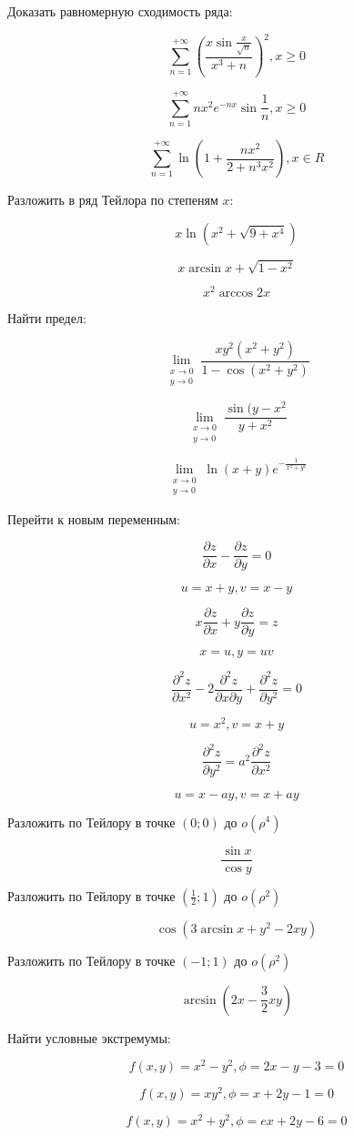 \documentclass[russian]{article}
\newcommand{\dir}[2]{\frac{\partial #1}{\partial #2}}
\newcommand{\dira}[3]{\frac{\partial^2 #1}{\partial #2 \partial #3}}
\newcommand{\dirb}[2]{\frac{\partial^2 #1}{\partial #2^2}}
\begin{document}
Доказать равномерную сходимость ряда:

$$\sum_{n = 1}^{+\infty} \left(\frac{x \sin \frac{x}{\sqrt{n}}}{x^ 3 + n} \right)^2, x \ge 0$$

$$\sum_{n = 1}^{+\infty} n x^2 e^{-nx} \sin \frac{1}{n}, x \ge 0$$

$$\sum_{n = 1}^{+\infty} \ln\left( 1 + \frac{nx^2}{2 + n^3x^2}\right), x \in R$$

Разложить в ряд Тейлора по степеням $x$:

$$x \ln (x^2 + \sqrt{9 + x^4})$$

$$x \arcsin x + \sqrt{1 - x^2}$$

$$x^2 \arccos 2x$$

Найти предел:

$$\lim_{\substack{x \to 0 \\ y \to 0}}  \frac{xy^2(x^2 + y^2)}{1 - \cos (x^2 + y^2)}$$

$$\lim_{\substack{x \to 0 \\ y \to 0}}  \frac{\sin(y - x^2}{y + x^2}$$

$$\lim_{\substack{x \to 0 \\ y \to 0}}  \ln(x + y) e^{-\frac{1}{x^2 + y^2}}$$

Перейти к новым переменным:

$$\dir{z}{x} - \dir{z}{y} = 0$$

$$u = x + y, v = x - y$$

$$x\dir{z}{x} + y\dir{z}{y} = z$$

$$x = u, y = uv$$

$$\dirb{z}{x} - 2\dira{z}{x}{y} + \dirb{z}{y} = 0$$

$$u = x^2, v = x + y$$

$$\dirb{z}{y} = a^2 \dirb{z}{x}$$

$$u = x - ay, v = x + ay$$

Разложить по Тейлору в точке $(0; 0)$ до $o(\rho^4)$

$$\frac{\sin{x}}{\cos{y}}$$

Разложить по Тейлору в точке $(\frac{1}{2}; 1)$ до $o(\rho^2)$

$$\cos(3\arcsin x + y^2 - 2xy)$$

Разложить по Тейлору в точке $(-1; 1)$ до $o(\rho^2)$

$$\arcsin(2x - \frac{3}{2}xy)$$

Найти условные экстремумы:

$$f(x, y) = x^2 - y^2, \phi = 2x - y - 3 = 0$$

$$f(x, y) = xy^2, \phi = x + 2y - 1 = 0$$

$$f(x, y) = x^2 + y^2, \phi = ex + 2y - 6 = 0$$
\end{document}
